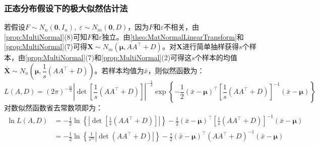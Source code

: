 \subsubsection{正态分布假设下的极大似然估计法}
\begin{derivation}
	若假设$F\sim N_n(\mathbf{0},I_n),\;\varepsilon\sim N_m(\mathbf{0},D)$，因为$F$和$\varepsilon$不相关，由\cref{prop:MultiNormal}(8)可知$F$和$\varepsilon$独立。由\cref{theo:MatNormalLinearTransform}和\cref{prop:MultiNormal}(7)可得$\mathbf{X}\sim N_m(\boldsymbol{\mu},AA^{\top}+D)$。对$\mathbf{X}$进行简单抽样获得$s$个样本，由\cref{prop:MultiNormal}(7)和\cref{prop:MultiNormal}(2)可得这$s$个样本的均值$\bar{\mathbf{X}}\sim N_n\left(\boldsymbol{\mu},\dfrac{1}{s}(AA^{\top}+D)\right)$。若样本均值为$\bar{x}$，则似然函数为：
	\begin{equation*}
		L(A,D)=(2\pi)^{-\frac{m}{2}}|\det[\frac{1}{s}(AA^{\top}+D)]|^{-\frac{1}{2}}\exp\left\{-\frac{1}{2}(\bar{x}-\boldsymbol{\mu})^{\top}\left[\frac{1}{s}(AA^{\top}+D)\right]^{-1}(\bar{x}-\boldsymbol{\mu})\right\}
	\end{equation*}
	对数似然函数省去常数项即为：
	\begin{align*}
		\ln L(A,D)&=-\frac{1}{2}\ln\left\{\left|\det\left[\frac{1}{s}(AA^{\top}+D)\right]\right|\right\}-\frac{1}{2}(\bar{x}-\boldsymbol{\mu})^{\top}\left[\frac{1}{s}(AA^{\top}+D)\right]^{-1}(\bar{x}-\boldsymbol{\mu}) \\
		&=-\frac{1}{2}\ln\left\{\frac{1}{s^m}\left|\det(AA^{\top}+D)\right|\right\}-\frac{s}{2}(\bar{x}-\boldsymbol{\mu})^{\top}(AA^{\top}+D)^{-1}(\bar{x}-\boldsymbol{\mu})
	\end{align*}
\end{derivation}

